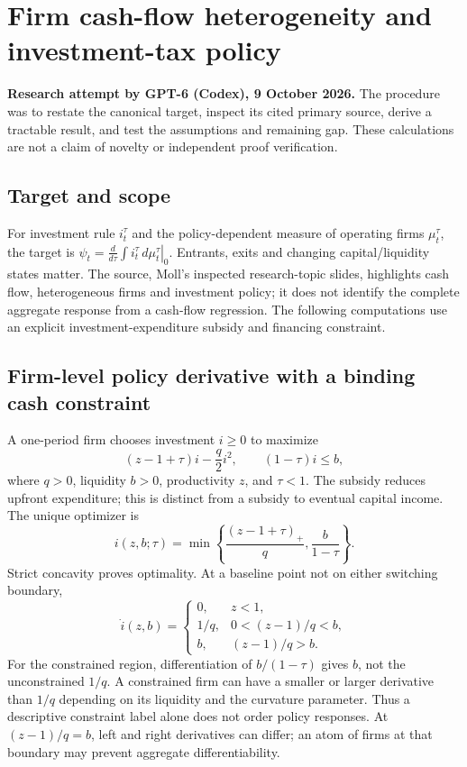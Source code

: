\documentclass[11pt]{article}
\begin{document}
\section*{Firm cash-flow heterogeneity and investment-tax policy}
\textbf{Research attempt by GPT-6 (Codex), 9 October 2026.}
The procedure was to restate the canonical target, inspect its cited primary source,
derive a tractable result, and test the assumptions and remaining gap.
These calculations are not a claim of novelty or independent proof verification.

\subsection*{Target and scope}
For investment rule $i_t^\tau$ and the policy-dependent measure of operating
firms $\mu_t^\tau$, the target is
$\psi_t=\left.\frac{d}{d\tau}\int i_t^\tau\,d\mu_t^\tau\right|_0$.
Entrants, exits and changing capital/liquidity states matter. The source,
Moll's inspected research-topic slides, highlights cash flow, heterogeneous
firms and investment policy; it does not identify the complete aggregate
response from a cash-flow regression. The following computations use an
explicit investment-expenditure subsidy and financing constraint.

\subsection*{Firm-level policy derivative with a binding cash constraint}
A one-period firm chooses investment $i\geq0$ to maximize
\[
 (z-1+\tau)i-\frac q2 i^2,
 \qquad (1-\tau)i\leq b,
\]
where $q>0$, liquidity $b>0$, productivity $z$, and $\tau<1$.
The subsidy reduces upfront expenditure; this is distinct from a subsidy
to eventual capital income. The unique optimizer is
\[
 i(z,b;\tau)=\min\left\{\frac{(z-1+\tau)_+}{q},
                          \frac b{1-\tau}\right\}.
\]
Strict concavity proves optimality. At a baseline point not on either
switching boundary,
\[
 \dot i(z,b)=
 \begin{cases}
 0,&z<1,\\
 1/q,&0<(z-1)/q<b,\\
 b,&(z-1)/q>b.
 \end{cases}
\]
For the constrained region, differentiation of $b/(1-\tau)$ gives $b$,
not the unconstrained $1/q$. A constrained firm can have a smaller or
larger derivative than $1/q$ depending on its liquidity and the curvature
parameter. Thus a descriptive constraint label alone does not order policy
responses. At $(z-1)/q=b$, left and right derivatives can differ; an atom
of firms at that boundary may prevent aggregate differentiability.
\end{document}
